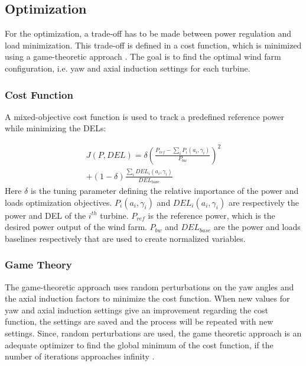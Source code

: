 \subsection{Optimization} \label{sec:optimization}
For the optimization, a trade-off has to be made between power regulation and load minimization. This trade-off is defined in a cost function, which is minimized using a game-theoretic approach \cite{Dijk2016, Marden2013}. The goal is to find the optimal wind farm configuration, i.e. yaw and axial induction settings for each turbine.
 

\subsubsection{Cost Function} \label{sec:costfunction}

A mixed-objective cost function is used to track a predefined reference power while minimizing the DELs: 

\begin{equation}
\begin{aligned}
J(P,DEL) = \delta\left(\frac{P_{ref}-\sum\nolimits_i P_i(a_i,\gamma_i)}{P_{bw}}\right)^2 \\ +
 (1-\delta)\frac{\sum\nolimits_i DEL_i(a_i,\gamma_i)}{DEL_\text{{base}}}
\end{aligned}
 \label{eq:costf}
\end{equation}
Here $\delta$ is the tuning parameter defining the relative importance of the power and loads optimization objectives. $P_i(a_i,\gamma_i)$ and $DEL_i(a_i,\gamma_i)$ are respectively the power and DEL of the $i^{th}$ turbine. $P_{ref}$ is the reference power, which is the desired power output of the wind farm. $P_{bw}$ and $DEL_{base}$ are the power and loads baselines respectively  that are used to create normalized variables.


\subsubsection{Game Theory} \label{sec:gametheory}
The game-theoretic approach uses random perturbations on the yaw angles and the axial induction factors to minimize the cost function. When new values for yaw and axial induction settings give an improvement regarding the cost function, the settings are saved and the process will be repeated with new settings. Since, random perturbations are used, the game theoretic approach is an adequate optimizer to find the global minimum of the cost function, if the number of iterations approaches infinity \cite{Dijk2016}.

